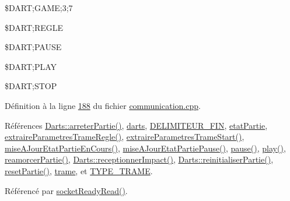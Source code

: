 \$\+D\+A\+RT;G\+A\+ME;3;7

\$\+D\+A\+RT;R\+E\+G\+LE

\$\+D\+A\+RT;P\+A\+U\+SE

\$\+D\+A\+RT;P\+L\+AY

\$\+D\+A\+RT;S\+T\+OP 

Définition à la ligne \hyperlink{communication_8cpp_source_l00188}{188} du fichier \hyperlink{communication_8cpp_source}{communication.\+cpp}.



Références \hyperlink{darts_8cpp_source_l00422}{Darts\+::arreter\+Partie()}, \hyperlink{communication_8h_source_l00093}{darts}, \hyperlink{communication_8h_source_l00030}{D\+E\+L\+I\+M\+I\+T\+E\+U\+R\+\_\+\+F\+IN}, \hyperlink{communication_8h_source_l00100}{etat\+Partie}, \hyperlink{communication_8cpp_source_l00279}{extraire\+Parametres\+Trame\+Regle()}, \hyperlink{communication_8cpp_source_l00243}{extraire\+Parametres\+Trame\+Start()}, \hyperlink{communication_8cpp_source_l00415}{mise\+A\+Jour\+Etat\+Partie\+En\+Cours()}, \hyperlink{communication_8cpp_source_l00393}{mise\+A\+Jour\+Etat\+Partie\+Pause()}, \hyperlink{class_communication_a369c7aeadc5c5926eb701bdebe53972c}{pause()}, \hyperlink{class_communication_a2645730b88adec069200debe05d212c3}{play()}, \hyperlink{communication_8cpp_source_l00305}{reamorcer\+Partie()}, \hyperlink{darts_8cpp_source_l00223}{Darts\+::receptionner\+Impact()}, \hyperlink{darts_8cpp_source_l00184}{Darts\+::reinitialiser\+Partie()}, \hyperlink{class_communication_af79d126304cca4281db4624b1b457ade}{reset\+Partie()}, \hyperlink{communication_8h_source_l00099}{trame}, et \hyperlink{communication_8h_source_l00024}{T\+Y\+P\+E\+\_\+\+T\+R\+A\+ME}.



Référencé par \hyperlink{communication_8cpp_source_l00166}{socket\+Ready\+Read()}.


